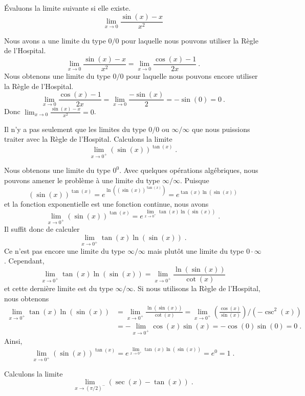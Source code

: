 {\begin{egg}[\eng]
Évaluons la limite suivante si elle existe.
\[
\lim_{x\rightarrow 0}\frac{\sin(x)-x}{x^2}
\]

Nous avons a une limite du type $0/0$ pour laquelle nous pouvons
utiliser la Règle de l'Hospital.
\[
  \lim_{x\rightarrow 0} \frac{\sin(x)-x}{x^2}
  = \lim_{x\rightarrow 0} \frac{\cos(x)-1}{2x} \ .
\]
Nous obtenons une limite du type $0/0$ pour laquelle nous pouvons encore
utiliser la Règle de l'Hospital.
\[
  \lim_{x\rightarrow 0} \frac{\cos(x)-1}{2x}
= \lim_{x\rightarrow 0} \frac{-\sin(x)}{2}  = -\sin(0) = 0 \ .
\]
Donc $\displaystyle \lim_{x\rightarrow 0}\frac{\sin(x)-x}{x^2} = 0$.
\end{egg}

\begin{egg}[\eng]
Il n'y a pas seulement que les limites du type $0/0$ ou
$\infty/\infty$ que nous puissions traiter avec la Règle de
l'Hospital. Calculons la limite
\[
\lim_{x\rightarrow 0^+} (\sin(x))^{\tan(x)} \; .
\]

Nous obtenons une limite du type $0^0$.  Avec quelques opérations
algébriques, nous pouvons amener le problème à une limite du type
$\infty/\infty$.  Puisque
\[
(\sin(x))^{\tan(x)} = e^{\ln\left((\sin(x))^{\tan(x)}\right)}
= e^{\tan(x) \ln(\sin(x))}
\]
et la fonction exponentielle est une fonction continue, nous avons
\[
\lim_{x\rightarrow 0^+} (\sin(x))^{\tan(x)}
= e^{\lim_{x\rightarrow 0^+} \tan(x) \ln(\sin(x))} \; .
\]
Il suffit donc de calculer
\[
\lim_{x\rightarrow 0^+} \tan(x) \ln(\sin(x)) \; .
\]
Ce n'est pas encore une limite du type $\infty/\infty$ mais plutôt une
limite du type $0\cdot \infty$.  Cependant,
\[
\lim_{x\rightarrow 0^+} \tan(x) \ln(\sin(x)) = 
\lim_{x\rightarrow 0^+} \frac{\ln(\sin(x))}{\cot(x)}
\]
et cette dernière limite est du type $\infty/\infty$.  Si nous utilisons
la Règle de l'Hospital, nous obtenons
\begin{align*}
\lim_{x\rightarrow 0^+} \tan(x) \ln(\sin(x)) &= 
\lim_{x\rightarrow 0^+} \frac{\ln(\sin(x))}{\cot(x)} =
\lim_{x\rightarrow 0^+} \left(\frac{\cos(x)}{\sin(x)}\right) \bigg/
\left( - \csc^2(x)\right) \\
&= - \lim_{x\rightarrow 0^+} \cos(x)\sin(x)
= -\cos(0)\sin(0) = 0 \; .
\end{align*}
Ainsi,
\[
\lim_{x\rightarrow 0^+} (\sin(x))^{\tan(x)}
= e^{\lim_{x\rightarrow 0^+} \tan(x) \ln(\sin(x))} = e^0 = 1 \; .
\]
\end{egg}

\begin{egg}[\eng]
Calculons la limite
\[
\lim_{x\rightarrow (\pi/2)^-} \left( \sec(x) - \tan(x)\right) \; .
\]


\end{egg}}

